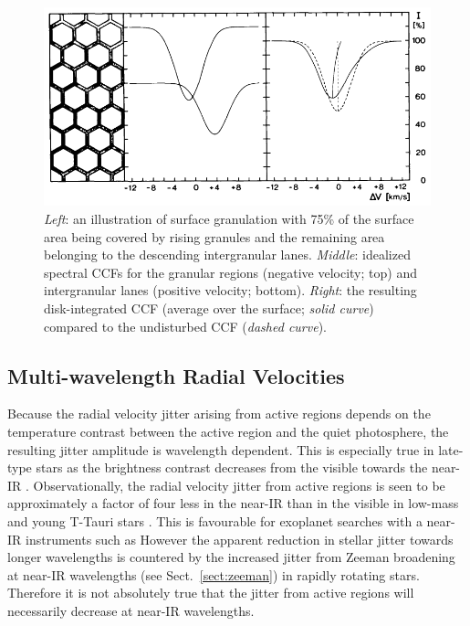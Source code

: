 \begin{figure}
\centering
\includegraphics[scale=.4]{figures/bis.png}
\caption{\emph{Left}: an illustration of surface granulation with 75\% of the surface area 
being covered by rising granules and the remaining area belonging to the descending intergranular 
lanes. \emph{Middle}: idealized spectral CCFs for the granular regions (negative velocity; top) and 
intergranular lanes (positive velocity; bottom). \emph{Right}: the resulting disk-integrated 
CCF (average over the surface; \emph{solid curve}) compared to the undisturbed CCF (\emph{dashed 
curve}). \parencite[Image credit:][]{dravins81} \label{fig:bis}}
\end{figure}

\subsection{Multi-wavelength Radial Velocities}
Because the radial velocity jitter arising from active regions depends on the temperature contrast 
between the active region and the quiet photosphere, the resulting jitter amplitude is wavelength 
dependent. This is especially true in late-type stars as 
the brightness contrast decreases from the visible towards 
the near-IR \parencite{hebrard14}. Observationally, the radial velocity jitter from active regions 
is seen to be 
approximately a factor of four less in the near-IR than in the visible in low-mass and young 
T-Tauri stars \parencite[e.g.][]{martin06, huelamo08, prato08, mahmud11}. This is favourable for 
exoplanet searches with a near-IR instruments such as  However the apparent reduction in 
stellar jitter towards longer wavelengths is countered by the increased jitter from Zeeman 
broadening at near-IR wavelengths (see Sect.~\ref{sect:zeeman}) in rapidly rotating stars. Therefore 
it is not absolutely true that the jitter from active regions will necessarily 
decrease at near-IR wavelengths. \\


